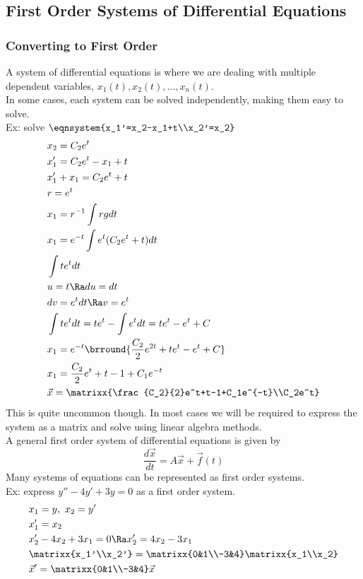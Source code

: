 \subsection{First Order Systems of Differential Equations}
\subsubsection{Converting to First Order}
A system of differential equations is where we are dealing with multiple dependent variables, $x_1(t), x_2(t), \ldots, x_n(t)$.\\
In some cases, each system can be solved independently, making them easy to solve.\\
Ex: solve $\displaystyle{\eqnsystem{x_1'=x_2-x_1+t\\x_2'=x_2}}$
\begin{align*}
    &x_2=C_2e^{t}\\
    &x_1'=C_2e^t-x_1+t\\
    &x_1'+x_1=C_2e^t+t\\
    &r=e^t\\
    &x_1=r^{-1}\int rgdt\\
    &x_1=e^{-t}\int e^t(C_2e^t+t)dt\\
    &\int te^tdt\\
    &u=t\Ra du=dt\\
    &dv=e^tdt\Ra v=e^t\\
    &\int te^tdt=te^t-\int e^tdt=te^t-e^t+C\\
    &x_1=e^{-t}\brround{\frac{C_2}{2}e^{2t}+te^t-e^t+C}\\
    &x_1=\frac{C_2}{2}e^t+t-1+C_1e^{-t}\\
    &\vec{x}=\matrixx{\frac{C_2}{2}e^t+t-1+C_1e^{-t}\\C_2e^t}
\end{align*}
This is quite uncommon though. In most cases we will be required to express the system as a matrix and solve using linear algebra methods.\\
A general first order system of differential equations is given by
$$\frac{d\vec{x}}{dt}=A\vec{x}+\vec{f}(t)$$
Many systems of equations can be represented as first order systems.\\
Ex: express $y''-4y'+3y=0$ as a first order system.
\begin{align*}
    &x_1=y,\ x_2=y'\\
    &x_1'=x_2\\
    &x_2'-4x_2+3x_1=0\Ra x_2'=4x_2-3x_1\\
    &\matrixx{x_1'\\x_2'}=\matrixx{0&1\\-3&4}\matrixx{x_1\\x_2}\\
    &\vec{x}'=\matrixx{0&1\\-3&4}\vec{x}
\end{align*}
